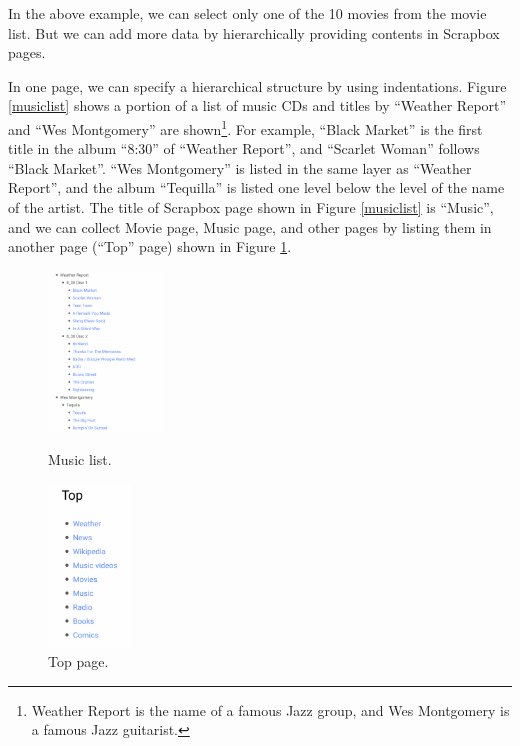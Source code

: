 \documentclass[conference]{IEEEtran}
\def\SB{Scrapbox}
\begin{document}
In the above example, we can select only one of the 10 movies from the movie list.
But we can add more data by hierarchically providing contents in {\SB} pages.

In one page, we can specify a hierarchical structure by using indentations.
Figure \ref{musiclist} shows a portion of a list of music CDs and
titles by ``Weather Report'' and ``Wes Montgomery'' are shown\footnote{
  Weather Report is the name of a famous Jazz group, and Wes Montgomery is a famous Jazz guitarist.
}.
For example, 
``Black Market'' is the first title in the album ``8:30'' of ``Weather Report'', and
``Scarlet Woman'' follows ``Black Market''.
``Wes Montgomery'' is listed in the same layer as ``Weather Report'', and
the album ``Tequilla'' is listed one level below the level of the name of the artist.
%
The title of {\SB} page shown in Figure \ref{musiclist} is ``Music'', and 
we can collect Movie page, Music page, and other pages by
listing them in another page (``Top'' page) shown in Figure \ref{top}.


\begin{figure}[H]
 \begin{minipage}{0.45\hsize}
  \centerline{\includegraphics[width=30mm,bb=0 0 652 926]{figures/d8fe8ff8f3e1bbcb34cf51e268592f8c.png}}
  \caption{Music list.}
  \label{musiclist}
 \end{minipage}
 \begin{minipage}{0.45\hsize}
  \centerline{\includegraphics[width=22mm,bb=0 0 262 515]{figures/5a644f357ba6a6b81b011e200019d736.png}}
  \caption{Top page.}
  \label{top}
 \end{minipage}
\end{figure}
\end{document}
